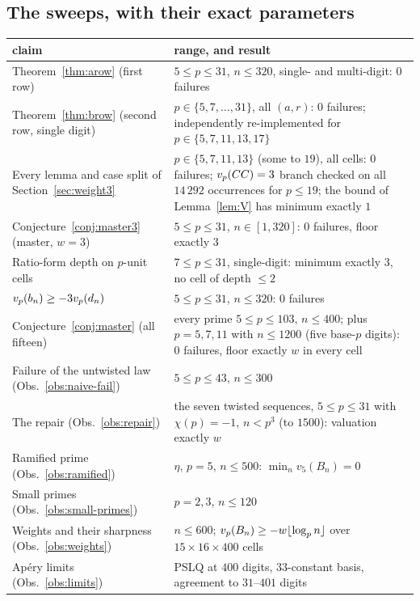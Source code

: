 \subsection{The sweeps, with their exact parameters}

\begin{center}\small
\begin{tabular}{@{}>{\raggedright\arraybackslash}p{6.7cm}>{\raggedright\arraybackslash}p{6.3cm}@{}}
\toprule
claim & range, and result\\
\midrule
Theorem~\ref{thm:arow} (first row) & $5\le p\le31$, $n\le320$, single- and multi-digit: $0$ failures\\
Theorem~\ref{thm:brow} (second row, single digit) & $p\in\{5,7,\dots,31\}$, all $(a,r)$: $0$ failures; independently re-implemented for $p\in\{5,7,11,13,17\}$\\
Every lemma and case split of Section~\ref{sec:weight3} & $p\in\{5,7,11,13\}$ (some to $19$), all cells: $0$ failures; $v_p(CC)=3$ branch checked on all $14\,292$ occurrences for $p\le19$; the bound of Lemma~\ref{lem:V} has minimum exactly $1$\\
Conjecture~\ref{conj:master3} (master, $w=3$) & $5\le p\le31$, $n\in[1,320]$: $0$ failures, floor exactly $3$\\
Ratio-form depth on $p$-unit cells & $7\le p\le31$, single-digit: minimum exactly $3$, no cell of depth $\le2$\\
$v_p(b_n)\ge-3v_p(d_n)$ & $5\le p\le31$, $n\le320$: $0$ failures\\
Conjecture~\ref{conj:master} (all fifteen) & every prime $5\le p\le103$, $n\le400$; plus $p=5,7,11$ with $n\le1200$ (five base-$p$ digits): $0$ failures, floor exactly $w$ in every cell\\
Failure of the untwisted law (Obs.~\ref{obs:naive-fail}) & $5\le p\le43$, $n\le300$\\
The repair (Obs.~\ref{obs:repair}) & the seven twisted sequences, $5\le p\le31$ with $\chi(p)=-1$, $n<p^3$ (to $1500$): valuation exactly $w$\\
Ramified prime (Obs.~\ref{obs:ramified}) & $\eta$, $p=5$, $n\le500$: $\min_nv_5(B_n)=0$\\
Small primes (Obs.~\ref{obs:small-primes}) & $p=2,3$, $n\le120$\\
Weights and their sharpness (Obs.~\ref{obs:weights}) & $n\le600$; $v_p(B_n)\ge-w\lfloor\log_pn\rfloor$ over $15\times16\times400$ cells\\
Ap\'ery limits (Obs.~\ref{obs:limits}) & PSLQ at $400$ digits, $33$-constant basis, agreement to $31$--$401$ digits\\

\end{tabular}
\end{center}
